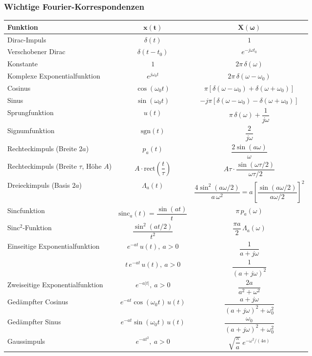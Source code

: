 \subsubsection{Wichtige Fourier-Korrespondenzen}
\begin{tabular}{|l|c|c|}
\hline
\textbf{Funktion} & $\boldsymbol{x(t)}$ & $\boldsymbol{X(\omega)}$ \\
\hline
Dirac-Impuls & $\delta(t)$ & $1$ \\
\hline
Verschobener Dirac & $\delta(t-t_0)$ & $e^{-j\omega t_0}$ \\
\hline
Konstante & $1$ & $2\pi\,\delta(\omega)$ \\
\hline
Komplexe Exponentialfunktion & $e^{j\omega_0 t}$ & $2\pi\,\delta(\omega-\omega_0)$ \\
\hline
Cosinus & $\cos(\omega_0 t)$ & $\pi\left[\delta(\omega-\omega_0)+\delta(\omega+\omega_0)\right]$ \\
\hline
Sinus & $\sin(\omega_0 t)$ & $-j\pi\left[\delta(\omega-\omega_0)-\delta(\omega+\omega_0)\right]$ \\
\hline
Sprungfunktion & $u(t)$ & $\pi\,\delta(\omega)+\dfrac{1}{j\omega}$ \\
\hline
Signumfunktion & $\mathrm{sgn}(t)$ & $\dfrac{2}{j\omega}$ \\
\hline
Rechteckimpuls (Breite $2a$) & $p_a(t)$ & $\dfrac{2\sin(a\omega)}{\omega}$ \\
\hline
Rechteckimpuls (Breite $\tau$, Höhe $A$) & $A\cdot\mathrm{rect}\!\left(\dfrac{t}{\tau}\right)$ & $A\tau\cdot\dfrac{\sin(\omega\tau/2)}{\omega\tau/2}$ \\
\hline
Dreieckimpuls (Basis $2a$) & $\Lambda_a(t)$ & $\dfrac{4\sin^2(a\omega/2)}{a\,\omega^2} = a\left[\dfrac{\sin(a\omega/2)}{a\omega/2}\right]^2$ \\
\hline
Sincfunktion & $\mathrm{sinc}_a(t)=\dfrac{\sin(at)}{t}$ & $\pi\,p_a(\omega)$ \\
\hline
Sinc$^2$-Funktion & $\dfrac{\sin^2(at/2)}{t^2}$ & $\dfrac{\pi a}{2}\,\Lambda_a(\omega)$ \\
\hline
Einseitige Exponentialfunktion & $e^{-at}\,u(t),\ a>0$ & $\dfrac{1}{a+j\omega}$ \\
\hline
 & $t\,e^{-at}\,u(t),\ a>0$ & $\dfrac{1}{(a+j\omega)^2}$ \\
\hline
Zweiseitige Exponentialfunktion & $e^{-a|t|},\ a>0$ & $\dfrac{2a}{a^2+\omega^2}$ \\
\hline
Gedämpfter Cosinus & $e^{-at}\cos(\omega_0 t)\,u(t)$ & $\dfrac{a+j\omega}{(a+j\omega)^2+\omega_0^2}$ \\
\hline
Gedämpfter Sinus & $e^{-at}\sin(\omega_0 t)\,u(t)$ & $\dfrac{\omega_0}{(a+j\omega)^2+\omega_0^2}$ \\
\hline
Gaussimpuls & $e^{-at^2},\ a>0$ & $\sqrt{\dfrac{\pi}{a}}\;e^{-\omega^2/(4a)}$ \\
\hline
\end{tabular}
\renewcommand{\arraystretch}{\arraystretchOriginal}
\medbreak

